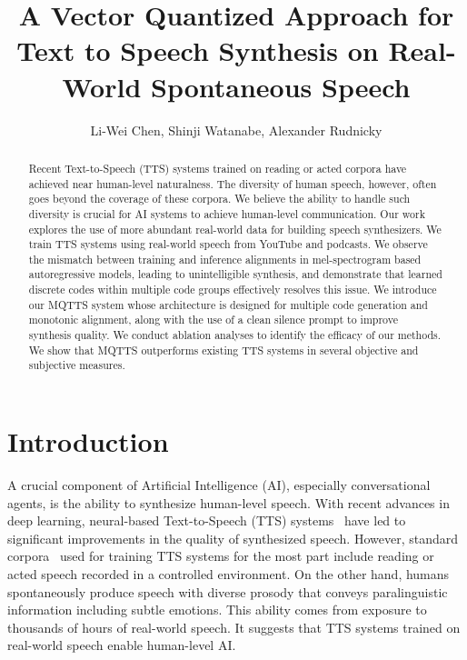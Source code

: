 \documentclass[letterpaper]{article} %
\title{A Vector Quantized Approach for Text to Speech Synthesis on Real-World Spontaneous Speech}
\author{
    Li-Wei Chen,
    Shinji Watanabe,
    Alexander Rudnicky
}
\begin{document}
\maketitle

\begin{abstract}
  Recent Text-to-Speech (TTS) systems trained on reading or acted corpora have achieved near human-level naturalness.
  The diversity of human speech, however, often goes beyond the coverage of these corpora.
  We believe the ability to handle such diversity is crucial for AI systems to achieve human-level communication.
  Our work explores the use of more abundant real-world data for building speech synthesizers.
  We train TTS systems using real-world speech from YouTube and podcasts.
  We observe the mismatch between training and inference alignments in mel-spectrogram based autoregressive models, leading to unintelligible synthesis, and demonstrate that learned discrete codes within multiple code groups effectively resolves this issue.
  We introduce our MQTTS system whose architecture is designed for multiple code generation and monotonic alignment, along with the use of a clean silence prompt to improve synthesis quality.
  We conduct ablation analyses to identify the efficacy of our methods.
  We show that MQTTS outperforms existing TTS systems in several objective and subjective measures.
\end{abstract}

\section{Introduction}
\label{sec:intro}
A crucial component of Artificial Intelligence (AI), especially conversational agents, is the ability to synthesize human-level speech.
With recent advances in deep learning, neural-based Text-to-Speech (TTS) systems~\cite{Li_Liu_Liu_Zhao_Liu_2019,NEURIPS2020_5c3b99e8,NEURIPS2019_f63f65b5} have led to significant improvements in the quality of synthesized speech.
However, standard corpora~\cite{ljspeech17,VCTK} used for training TTS systems for the most part include reading or acted speech recorded in a controlled environment.
On the other hand, humans spontaneously produce speech with diverse prosody that conveys paralinguistic information including subtle emotions. This ability comes from exposure to thousands of hours of real-world speech.
It suggests that TTS systems trained on real-world speech enable human-level AI.
\end{document}
